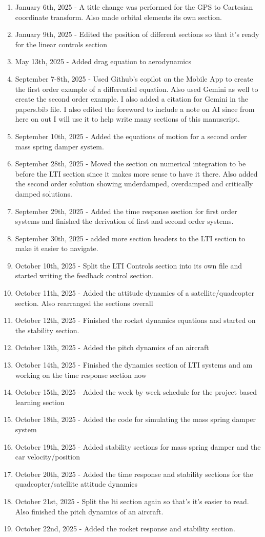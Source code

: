 \begin{enumerate}[itemsep=-5pt]
\item January 6th, 2025 - A title change was performed for the GPS to Cartesian coordinate transform. Also made orbital elements its own section.
\item January 9th, 2025 - Edited the position of different sections so that it's ready for the linear controls section
\item May 13th, 2025 - Added drag equation to aerodynamics
\item September 7-8th, 2025 - Used Github's copilot on the Mobile App to create the first order example of a differential equation. Also used Gemini as well to create the second order example. I also added a citation for Gemini in the papers.bib file. I also edited the foreword to include a note on AI since from here on out I will use it to help write many sections of this manuscript.
\item September 10th, 2025 - Added the equations of motion for a second order mass spring damper system.
\item September 28th, 2025 - Moved the section on numerical integration to be before the LTI section since it makes more sense to have it there. Also added the second order solution showing underdamped, overdamped and critically damped solutions.
\item September 29th, 2025 - Added the time response section for first order systems and finished the derivation of first and second order systems.
\item September 30th, 2025 - added more section headers to the LTI section to make it easier to navigate.
\item October 10th, 2025 - Split the LTI Controls section into its own file and started writing the feedback control section.
\item October 11th, 2025 - Added the attitude dynamics of a satellite/quadcopter section. Also rearranged the sections overall
\item October 12th, 2025 - Finished the rocket dynamics equations and started on the stability section.
\item October 13th, 2025 - Added the pitch dynamics of an aircraft
\item October 14th, 2025 - Finished the dynamics section of LTI systems and am working on the time response section now
\item October 15th, 2025 - Added the week by week schedule for the project based learning section
\item October 18th, 2025 - Added the code for simulating the mass spring damper system
\item October 19th, 2025 - Added stability sections for mass spring damper and the car velocity/position
\item October 20th, 2025 - Added the time response and stability sections for the quadcopter/satellite attitude dynamics
\item October 21st, 2025 - Split the lti section again so that's it's easier to read. Also finished the pitch dynamics of an aircraft.
\item October 22nd, 2025 - Added the rocket response and stability section.
\end{enumerate}

